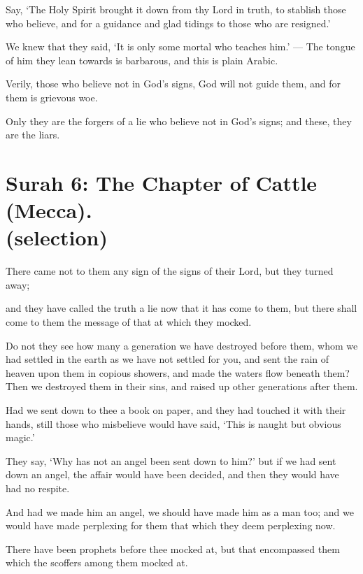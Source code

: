 \documentclass[fontsize=14pt, letterpaper, notitlepage, openany, DIV=12]{scrbook} %
\begin{document}
\noindent[16:102]
Say, `The Holy Spirit brought it down from thy Lord in truth, to stablish those who
believe, and for a guidance and glad tidings to those who are resigned.'

\noindent[16:103]
We knew that they said, `It is only some mortal who teaches him.' --- The tongue of him
they lean towards is barbarous, and this is plain Arabic.

\noindent[16:104]
Verily, those who believe not in God's signs, God will not guide them, and for them is
grievous woe.

\noindent[16:105]
Only they are the forgers of a lie who believe not in God's signs; and these, they are the
liars.


\section[Surah 6: The Chapter of Cattle (Mecca).]{Surah 6: The Chapter of Cattle (Mecca).\\ (selection)}


\noindent[6:4]
There came not to them any sign of the signs of their Lord, but they turned away;

\noindent[6:5]
and they have called the truth a lie now that it has come to them, but there shall come to
them the message of that at which they mocked.

\noindent[6:6]
Do not they see how many a generation we have destroyed before them, whom we had
settled in the earth as we have not settled for you, and sent the rain of heaven upon them in
copious showers, and made the waters flow beneath them? Then we destroyed them in their sins,
and raised up other generations after them.

\noindent[6:7]
Had we sent down to thee a book on paper, and they had touched it with their hands, still
those who misbelieve would have said, `This is naught but obvious magic.'

\noindent[6:8]
They say, `Why has not an angel been sent down to him?' but if we had sent down an
angel, the affair would have been decided, and then they would have had no respite.

\noindent[6:9]
And had we made him an angel, we should have made him as a man too; and we would
have made perplexing for them that which they deem perplexing now.

\noindent[6:10]
There have been prophets before thee mocked at, but that encompassed them which the
scoffers among them mocked at.
\end{document}

